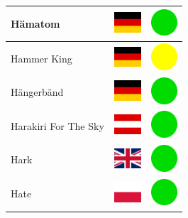 \documentclass[12pt, a4paper, twoside]{report}
\begin{document}
\begin{center}
\begin{longtable}{|p{5cm}|p{2cm}|p{2cm}|}
Hämatom & \includegraphics[width=1cm]{4x3/de} & \includegraphics[width=1cm]{likes/y} \\ \hline
Hammer King & \includegraphics[width=1cm]{4x3/de} & \includegraphics[width=1cm]{likes/m} \\ \hline
Hängerbänd & \includegraphics[width=1cm]{4x3/de} & \includegraphics[width=1cm]{likes/y} \\ \hline
Harakiri For The Sky & \includegraphics[width=1cm]{4x3/at} & \includegraphics[width=1cm]{likes/y} \\ \hline
Hark & \includegraphics[width=1cm]{4x3/gb} & \includegraphics[width=1cm]{likes/y} \\ \hline
Hate & \includegraphics[width=1cm]{4x3/pl} & \includegraphics[width=1cm]{likes/y} \\ \hline

\end{longtable}
\end{center}
\end{document}
